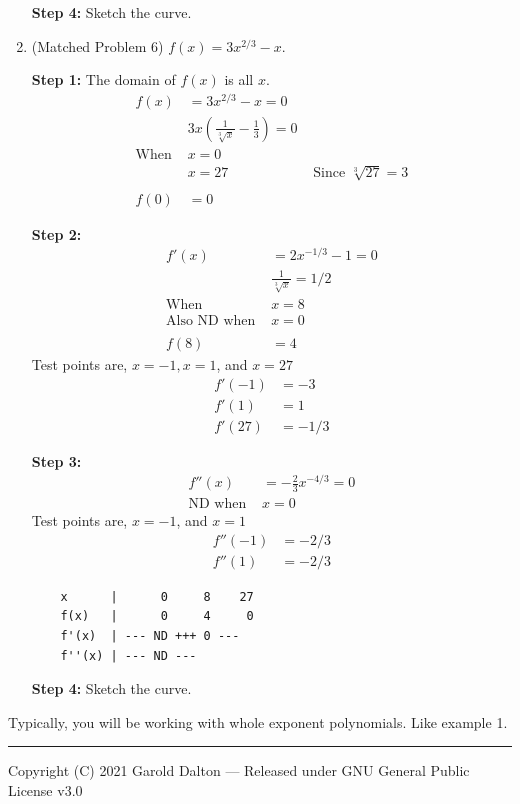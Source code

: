 \documentclass[14pt]{extarticle}
\begin{document}
\begin{enumerate}
\textbf{Step 4:} Sketch the curve.

\vspace{2em}

\item (Matched Problem 6)  $f(x)=3x^{2/3}-x$.

\textbf{Step 1:} The domain of $f(x)$ is all $x$.
\begin{align*}
	f(x) &=3x^{2/3}-x =0 \\
	&3x(\frac{1}{\sqrt[3]{x}}-\frac{1}{3}) = 0 \\
	\text{When } &x=0\\
	&x=27 &\text{ Since $\sqrt[3]{27}=3$} \\\\
	f(0) &=0
\end{align*}

\textbf{Step 2:}
\begin{align*}
	f'(x) &= 2x^{-1/3} -1 = 0 \\
	&\frac{1}{\sqrt[3]{x}}	=1/2 \\
	\text{When } &x=8 \\
	\text{Also ND when } &x=0\\\\
	f(8) &= 4
\end{align*}
Test points are, $x=-1, x=1$, and $x=27$
\begin{align*}	
	f'(-1) &= -3 \\
	f'(1) &=1 \\
	f'(27) &= -1/3
\end{align*}

\textbf{Step 3:}
\begin{align*}
	f''(x) &= -\frac{2}{3}x^{-4/3} =0 \\
	\text{ND when } &x=0
\end{align*}
Test points are, $x=-1$, and $x=1$
\begin{align*}	
	f''(-1) &= -2/3 \\
	f''(1) &= -2/3
\end{align*}

\begin{verbatim}
	x      |      0     8    27    
	f(x)   |      0     4     0
	f'(x)  | --- ND +++ 0 ---  
	f''(x) | --- ND ---   
\end{verbatim}

\textbf{Step 4:} Sketch the curve.
	
\end{enumerate}

Typically, you will be working with whole exponent polynomials. Like example 1.


\noindent\rule{\textwidth}{1pt}
{\footnotesize Copyright (C) 2021 Garold Dalton --- Released under GNU General Public License v3.0}


\cleardoublepage	
	
\end{document}
